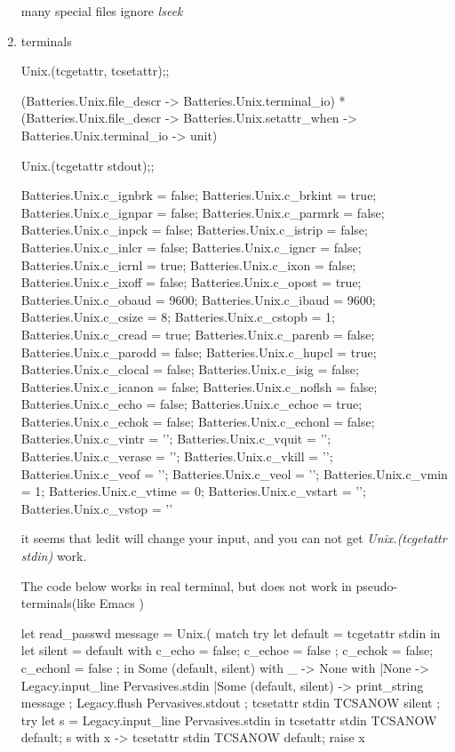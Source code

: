 \begin{enumerate}
many special files ignore \textit{lseek}
\item terminals \\

  \begin{alternate}
Unix.(tcgetattr, tcsetattr);;
\end{alternate}
\begin{ocamlcode}
(Batteries.Unix.file_descr -> Batteries.Unix.terminal_io) *
(Batteries.Unix.file_descr ->
     Batteries.Unix.setattr_when -> Batteries.Unix.terminal_io -> unit)
\end{ocamlcode}
  
  \begin{alternate}
Unix.(tcgetattr stdout);;    
\end{alternate}

\begin{ocamlcode}
{Batteries.Unix.c_ignbrk = false; Batteries.Unix.c_brkint = true;
 Batteries.Unix.c_ignpar = false; Batteries.Unix.c_parmrk = false;
 Batteries.Unix.c_inpck = false; Batteries.Unix.c_istrip = false;
 Batteries.Unix.c_inlcr = false; Batteries.Unix.c_igncr = false;
 Batteries.Unix.c_icrnl = true; Batteries.Unix.c_ixon = false;
 Batteries.Unix.c_ixoff = false; Batteries.Unix.c_opost = true;
 Batteries.Unix.c_obaud = 9600; Batteries.Unix.c_ibaud = 9600;
 Batteries.Unix.c_csize = 8; Batteries.Unix.c_cstopb = 1;
 Batteries.Unix.c_cread = true; Batteries.Unix.c_parenb = false;
 Batteries.Unix.c_parodd = false; Batteries.Unix.c_hupcl = true;
 Batteries.Unix.c_clocal = false; Batteries.Unix.c_isig = false;
 Batteries.Unix.c_icanon = false; Batteries.Unix.c_noflsh = false;
 Batteries.Unix.c_echo = false; Batteries.Unix.c_echoe = true;
 Batteries.Unix.c_echok = false; Batteries.Unix.c_echonl = false;
 Batteries.Unix.c_vintr = ''; Batteries.Unix.c_vquit = '';
 Batteries.Unix.c_verase = ''; Batteries.Unix.c_vkill = '';
 Batteries.Unix.c_veof = ''; Batteries.Unix.c_veol = '';
 Batteries.Unix.c_vmin = 1; Batteries.Unix.c_vtime = 0;
 Batteries.Unix.c_vstart = ''; Batteries.Unix.c_vstop = ''}  
\end{ocamlcode}

it seems that ledit will change your input, and you can not get
\textit{Unix.(tcgetattr stdin)} work.

The code below works in real terminal, but does not work in
pseudo-terminals(like Emacs )

\begin{ocamlcode}
let read_passwd message = Unix.(
match 
   try 
    let default = tcgetattr stdin in 
    let silent = {default with c_echo = false; c_echoe = false ; 
                  c_echok = false; c_echonl = false ; } in 
     Some (default, silent)
   with _ -> None 
with
 |None -> Legacy.input_line Pervasives.stdin 
 |Some (default, silent) -> 
   print_string message ; 
   Legacy.flush Pervasives.stdout ; 
   tcsetattr stdin TCSANOW silent ; 
   try 
     let s = Legacy.input_line Pervasives.stdin in 
     tcsetattr stdin TCSANOW default; s 
   with x ->      tcsetattr stdin TCSANOW default; raise x 
    

\end{ocamlcode}
\end{enumerate}
